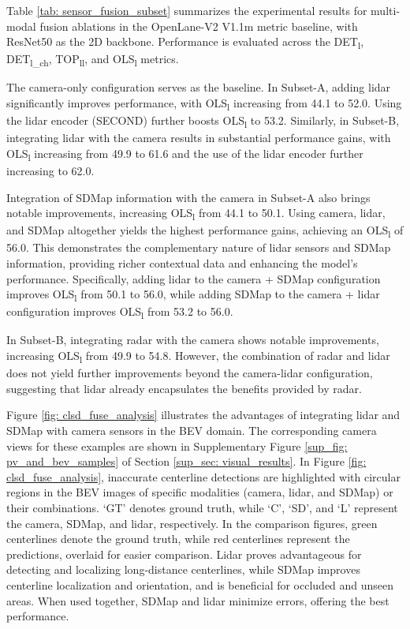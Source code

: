 Table \ref{tab: sensor_fusion_subset} summarizes the experimental results for multi-modal fusion ablations in the OpenLane-V2 V1.1m metric baseline, with ResNet50 as the 2D backbone. Performance is evaluated across the DET\textsubscript{l}, DET\textsubscript{l\_ch}, TOP\textsubscript{ll}, and OLS\textsubscript{l} metrics.

The camera-only configuration serves as the baseline. In Subset-A, adding lidar significantly improves performance, with OLS\textsubscript{l} increasing from 44.1 to 52.0. Using the lidar encoder (SECOND) \cite{yan2018second} further boosts OLS\textsubscript{l} to 53.2. Similarly, in Subset-B, integrating lidar with the camera results in substantial performance gains, with OLS\textsubscript{l} increasing from 49.9 to 61.6 and the use of the lidar encoder further increasing to 62.0.

Integration of SDMap information with the camera in Subset-A also brings notable improvements, increasing OLS\textsubscript{l} from 44.1 to 50.1. Using camera, lidar, and SDMap altogether yields the highest performance gains, achieving an OLS\textsubscript{l} of 56.0. This demonstrates the complementary nature of lidar sensors and SDMap information, providing richer contextual data and enhancing the model's performance. Specifically, adding lidar to the camera + SDMap configuration improves OLS\textsubscript{l} from 50.1 to 56.0, while adding SDMap to the camera + lidar configuration improves OLS\textsubscript{l} from 53.2 to 56.0.

In Subset-B, integrating radar with the camera shows notable improvements, increasing OLS\textsubscript{l} from 49.9 to 54.8. However, the combination of radar and lidar does not yield further improvements beyond the camera-lidar configuration, suggesting that lidar already encapsulates the benefits provided by radar.

Figure \ref{fig: clsd_fuse_analysis} illustrates the advantages of integrating lidar and SDMap with camera sensors in the BEV domain. The corresponding camera views for these examples are shown in Supplementary Figure \ref{sup_fig: pv_and_bev_samples} of Section \ref{sup_sec: visual_results}. In Figure \ref{fig: clsd_fuse_analysis}, inaccurate centerline detections are highlighted with circular regions in the BEV images of specific modalities (camera, lidar, and SDMap) or their combinations. `GT' denotes ground truth, while `C', `SD', and `L' represent the camera, SDMap, and lidar, respectively. In the comparison figures, green centerlines denote the ground truth, while red centerlines represent the predictions, overlaid for easier comparison. Lidar proves advantageous for detecting and localizing long-distance centerlines, while SDMap improves centerline localization and orientation, and is beneficial for occluded and unseen areas. When used together, SDMap and lidar minimize errors, offering the best performance.

